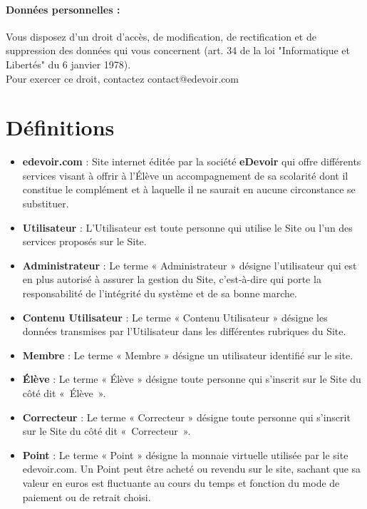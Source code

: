\paragraph*{Données personnelles :}
Vous disposez d'un droit d'accès, de modification, de rectification et de suppression des données qui vous concernent (art. 34 de la loi "Informatique et Libertés" du 6 janvier 1978).\\
Pour exercer ce droit, contactez contact@edevoir.com


\section{Définitions}

\begin{itemize}
  \item \textbf{edevoir.com} : Site internet éditée par la société \textbf{eDevoir} qui offre différents services visant à offrir à l'\'Elève un accompagnement de sa scolarité dont il constitue le complément et à laquelle il ne saurait en aucune circonstance se substituer.

  \item \textbf{Utilisateur} : L'Utilisateur est toute personne qui utilise le Site ou l'un des services proposés sur le Site.

  \item \textbf{Administrateur} : Le terme « Administrateur » désigne l'utilisateur qui est en plus autorisé à assurer la gestion du Site, c'est-à-dire qui porte la responsabilité de l'intégrité du système et de sa bonne marche.
  
  \item \textbf{Contenu Utilisateur} : Le terme « Contenu Utilisateur » désigne les données transmises par l'Utilisateur dans les différentes rubriques du Site.

  \item \textbf{Membre} : Le terme « Membre » désigne un utilisateur identifié sur le site.

  \item \textbf{\'Elève} : Le terme « \'Elève » désigne toute personne qui s'inscrit sur le Site du côté dit «~\'Elève~».

  \item \textbf{Correcteur} : Le terme « Correcteur » désigne toute personne qui s'inscrit sur le Site du côté dit «~Correcteur~».
  
  \item \textbf{Point} : Le terme « Point » désigne la monnaie virtuelle utilisée par le site edevoir.com. Un Point peut être acheté ou revendu sur le site, sachant que sa valeur en euros est fluctuante au cours du temps et fonction du mode de paiement ou de retrait choisi.


\end{itemize}
